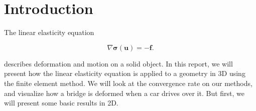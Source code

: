 \section{Introduction}



The linear elasticity equation

\begin{equation}
\label{eq:linEl}
\nabla \bm{\sigma}(\bm{u}) = - \bm{f}.
\end{equation}

describes deformation and motion on a solid object. In this report, we will present how the linear elasticity equation is applied to a geometry in 3D using the finite element method. We will look at the convergence rate on our methods, and visualize how a bridge is deformed when a car drives over it. But first, we will present some basic results in 2D. 